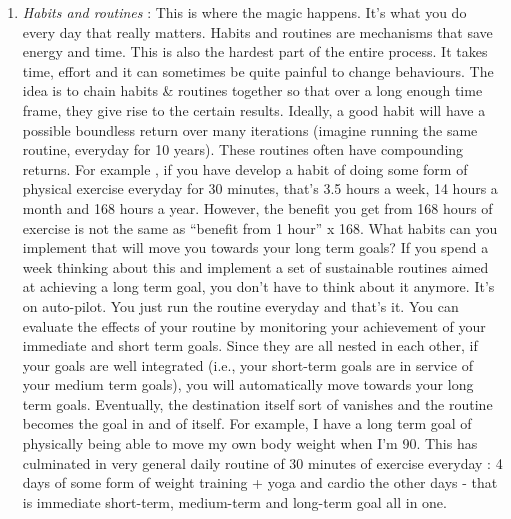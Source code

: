 \documentclass[10pt,twocolumn]{extarticle}
\begin{document}
\begin{enumerate}
    \item \textit{Habits and routines} :  This is where the magic happens. It’s what you do every day that really matters. Habits and routines are mechanisms that save energy and time. This is also the hardest part of the entire process. It takes time, effort and it can sometimes be quite painful to change behaviours. The idea is to chain habits \& routines together so that over a long enough time frame, they give rise to the certain results. Ideally, a good habit will have a possible boundless return over many iterations (imagine running the same routine, everyday for 10 years). These routines often have compounding returns. For example , if you have develop a habit of doing some form of physical exercise everyday for 30 minutes, that’s 3.5 hours a week, 14 hours a month and 168 hours a year. However, the benefit you get from 168 hours of exercise is not the same as “benefit from 1 hour” x 168. What habits can you implement that will move you towards your long term goals? If you spend a week thinking about this and implement a set of sustainable routines aimed at achieving a long term goal, you don’t have to think about it anymore. It’s on auto-pilot. You just run the routine everyday and that’s it. You can evaluate the effects of your routine by monitoring your achievement of your immediate and short term goals. Since they are all nested in each other, if your goals are well integrated (i.e., your short-term goals are in service of your medium term goals), you will automatically move towards your long term goals. Eventually, the destination itself sort of vanishes and the routine becomes the goal in and of itself. For example, I have a long term goal of physically being able to move my own body weight when I’m 90. This has culminated in very general daily routine of 30 minutes of exercise everyday : 4 days of some form of weight training + yoga and cardio the other days - that is immediate short-term, medium-term and long-term goal all in one.
\end{enumerate}
\end{document}
